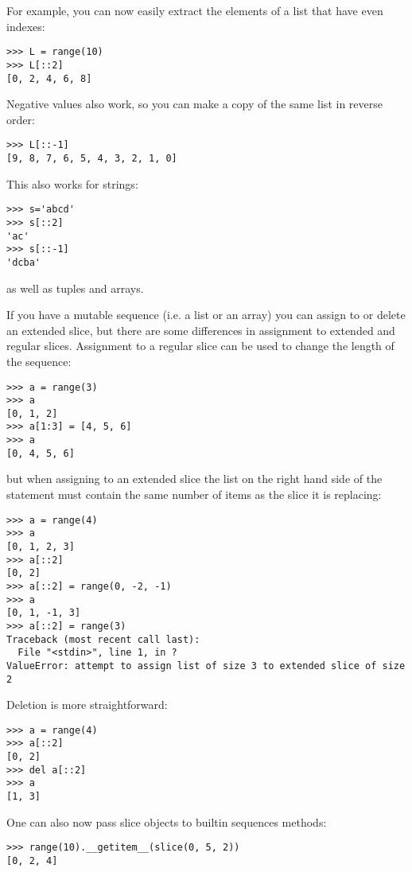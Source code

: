 \documentclass{howto}
\begin{document}
For example, you can now easily extract the elements of a list that
have even indexes:

\begin{verbatim}
>>> L = range(10)
>>> L[::2]
[0, 2, 4, 6, 8]
\end{verbatim}

Negative values also work, so you can make a copy of the same list in
reverse order:

\begin{verbatim}
>>> L[::-1]
[9, 8, 7, 6, 5, 4, 3, 2, 1, 0]
\end{verbatim}

This also works for strings:

\begin{verbatim}
>>> s='abcd'
>>> s[::2]
'ac'
>>> s[::-1]
'dcba'
\end{verbatim}

as well as tuples and arrays.

If you have a mutable sequence (i.e. a list or an array) you can
assign to or delete an extended slice, but there are some differences
in assignment to extended and regular slices.  Assignment to a regular
slice can be used to change the length of the sequence:

\begin{verbatim}
>>> a = range(3)
>>> a
[0, 1, 2]
>>> a[1:3] = [4, 5, 6]
>>> a
[0, 4, 5, 6]
\end{verbatim}

but when assigning to an extended slice the list on the right hand
side of the statement must contain the same number of items as the
slice it is replacing:

\begin{verbatim}
>>> a = range(4)
>>> a
[0, 1, 2, 3]
>>> a[::2]
[0, 2]
>>> a[::2] = range(0, -2, -1)
>>> a
[0, 1, -1, 3]
>>> a[::2] = range(3)
Traceback (most recent call last):
  File "<stdin>", line 1, in ?
ValueError: attempt to assign list of size 3 to extended slice of size 2
\end{verbatim}

Deletion is more straightforward:

\begin{verbatim}
>>> a = range(4)
>>> a[::2]
[0, 2]
>>> del a[::2]
>>> a
[1, 3]
\end{verbatim}

One can also now pass slice objects to builtin sequences
 methods:

\begin{verbatim}
>>> range(10).__getitem__(slice(0, 5, 2))
[0, 2, 4]
\end{verbatim}
\end{document}
